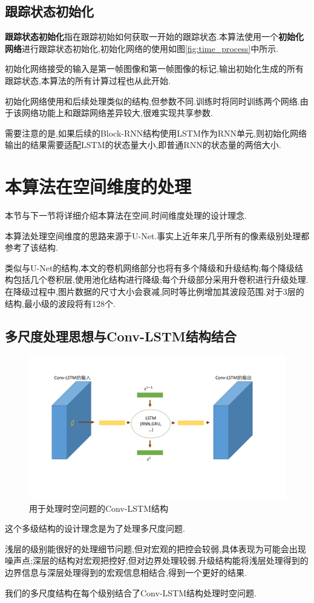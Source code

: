 \subsection{跟踪状态初始化}
\textbf{跟踪状态初始化}指在跟踪初始如何获取一开始的跟踪状态.本算法使用一个\textbf{初始化网络}进行跟踪状态初始化,初始化网络的使用如图\ref{fig:time_process}中所示.
\par
初始化网络接受的输入是第一帧图像和第一帧图像的标记,输出初始化生成的所有跟踪状态,本算法的所有计算过程也从此开始.
\par
初始化网络使用和后续处理类似的结构,但参数不同.训练时将同时训练两个网络.由于该网络功能上和跟踪网络差异较大,很难实现共享参数.
\par
需要注意的是,如果后续的Block-RNN结构使用LSTM作为RNN单元,则初始化网络输出的结果需要适配LSTM的状态量大小,即普通RNN的状态量的两倍大小.

\section{本算法在空间维度的处理}
本节与下一节将详细介绍本算法在空间,时间维度处理的设计理念.
\par
本算法处理空间维度的思路来源于U-Net\supercite{ronneberger2015u}.事实上近年来几乎所有的像素级别处理都参考了该结构.
\par
类似与U-Net的结构,本文的卷机网络部分也将有多个降级和升级结构;每个降级结构包括几个卷积层,使用池化结构进行降级;每个升级部分采用升卷积进行升级处理.在降级过程中,图片数据的尺寸大小会衰减,同时等比例增加其波段范围.对于3层的结构,最小级的波段将有128个.

\subsection{多尺度处理思想与Conv-LSTM结构结合} \label{section:multiscale}
\par
\begin{figure}[htbp!]
    \centering
    \includegraphics[width = 1.\textwidth]{chap/img/crnn.pdf}
    \caption{用于处理时空问题的Conv-LSTM结构}
    \label{fig:conv_lstm_arch}
\end{figure}
\par
这个多级结构的设计理念是为了处理多尺度问题.
\par
浅层的级别能很好的处理细节问题,但对宏观的把控会较弱,具体表现为可能会出现噪声点;深层的结构对宏观把控好,但对边界处理较弱.升级结构能将浅层处理得到的边界信息与深层处理得到的宏观信息相结合,得到一个更好的结果.
\par
我们的多尺度结构在每个级别结合了Conv-LSTM结构处理时空问题.

